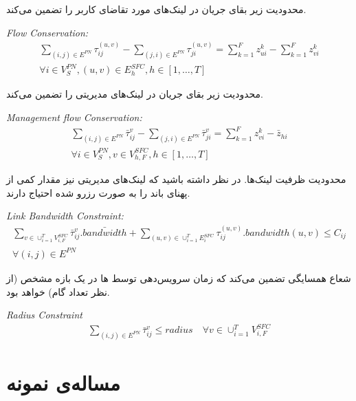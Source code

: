 محدودیت زیر بقای جریان در لینک‌های مورد تقاضای کاربر را تضمین می‌کند.
\begin{latin}
    \textit{Flow Conservation:}
    \begin{align}
        \sum_{(i,j) \in E^{PN}} \tau_{ij}^{(u,v)} - \sum_{(j,i) \in E^{PN}} \tau_{ji}^{(u,v)} = \sum_{k=1}^{F} z_{ui}^{k} - \sum_{k=1}^{F} z_{vi}^{k} \nonumber \\
        \forall i \in V_{S}^{PN}, (u,v) \in E_{h}^{SFC}, h \in [1,\ldots, T]
    \end{align}
\end{latin}

محدودیت زیر بقای جریان در لینک‌های مدیریتی را تضمین می‌کند.
\begin{latin}
    \textit{Management flow Conservation:}
    \begin{align}
        \sum_{(i,j) \in E^{PN}} \bar{\tau}_{ij}^{v} - \sum_{(j,i) \in E^{PN}} \bar{\tau}_{ji}^{v} = \sum_{k=1}^{F} z_{vi}^{k} - \bar{z}_{hi} \nonumber \\
        \forall i \in V_{S}^{PN}, v \in V_{h, F}^{SFC}, h \in [1,\ldots, T]
    \end{align}
\end{latin}

محدودیت ظرفیت لینک‌ها.
در نظر داشته باشید که لینک‌های مدیریتی نیز مقدار کمی از پهنای باند را به صورت رزرو شده احتیاج دارند.
\begin{latin}
    \textit{Link Bandwidth Constraint:}
    \begin{align}
        \sum_{v \in \cup_{i=1}^{T} V_{i,F}^{SFC}} \bar{\tau}_{ij}^{v} . \bar{bandwidth} + \sum_{(u,v) \in \cup_{i=1}^{T} E_{i}^{SFC}} \tau_{ij}^{(u,v)} . bandwidth(u,v) \le C_{ij} \nonumber \\
        \forall (i, j) \in E^{PN}
    \end{align}
\end{latin}

شعاع همسایگی تضمین می‌کند که زمان سرویس‌دهی توسط
ها
در یک بازه مشخص (از نظر تعداد گام)
خواهد بود.
\begin{latin}
    \textit{Radius Constraint}
    \begin{align}
        \sum_{(i, j) \in E^{PN}} \bar{\tau}_{ij}^{v} \le radius
        \quad
        \forall v \in \cup_{i=1}^T V_{i, F}^{SFC}
    \end{align}
\end{latin}

\section{مساله‌ی نمونه}

